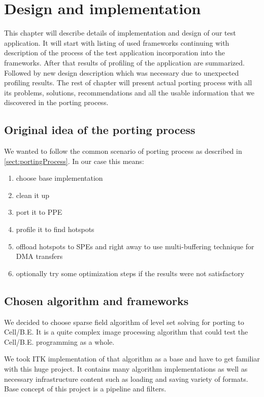 \chapter{Design and implementation}

This chapter will describe details of implementation and design of our test application.
It will start with listing of used frameworks continuing with description of the process of the test application incorporation into the frameworks.
After that results of profiling of the application are summarized.
Followed by new design description which was necessary due to unexpected profiling results.
The rest of chapter will present actual porting process with all its problems, solutions, recommendations and all the usable information that we discovered in the porting process.

\section{Original idea of the porting process}

We wanted to follow the common scenario of porting process as described in \ref{sect:portingProcess}.
In our case this means:
\begin{enumerate}
\item{choose base implementation}
\item{clean it up}
\item{port it to PPE}
\item{profile it to find hotspots}
\item{offload hotspots to SPEs and right away to use multi-buffering technique for DMA transfers}
\item{optionally try some optimization steps if the results were not satisfactory}
\end{enumerate}

\section{Chosen algorithm and frameworks}

\par
We decided to choose sparse field algorithm of level set solving for porting to \mbox{Cell/B.E.}
It is a quite complex image processing algorithm that could test the \mbox{Cell/B.E.} programming as a whole.

\par
We took ITK \cite{itk} implementation of that algorithm as a base and have to get familiar with this huge project.
It contains many algorithm implementations as well as necessary infrastructure content such as loading and saving variety of formats.
Base concept of this project is a pipeline and filters.

